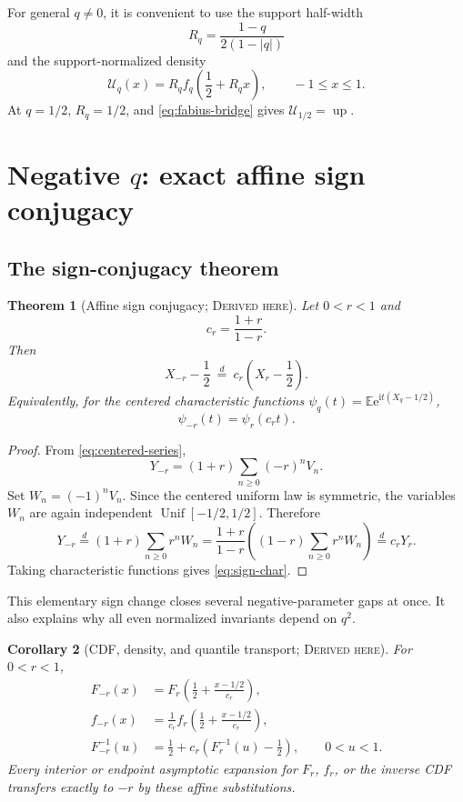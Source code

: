 \documentclass[11pt,oneside]{article}
\newtheorem{theorem}{Theorem}[section]
\newtheorem{corollary}[theorem]{Corollary}
\theoremstyle{definition}
\theoremstyle{remark}
\newcommand{\E}{\mathbb E}
\newcommand{\Unif}{\operatorname{Unif}}
\newcommand{\Up}{\operatorname{up}}
\newcommand{\ii}{\mathrm i}
\newcommand{\e}{\mathrm e}
\newcommand{\Derived}{\textsc{Derived here}}
\begin{document}
For general \(q\ne0\), it is convenient to use the support half-width
\begin{equation}\label{eq:Rq}
 R_q=\frac{1-q}{2(1-|q|)}
\end{equation}
and the support-normalized density
\begin{equation}\label{eq:Uq-def}
 \mathcal U_q(x)=R_q f_q\!\left(\frac12+R_qx\right),\qquad -1\le x\le1.
\end{equation}
At \(q=1/2\), \(R_q=1/2\), and \eqref{eq:fabius-bridge} gives
\(\mathcal U_{1/2}=\Up\).

\section{Negative \texorpdfstring{\(q\)}{q}: exact affine sign conjugacy}

\subsection{The sign-conjugacy theorem}
\begin{theorem}[Affine sign conjugacy; \Derived]\label{thm:sign-conjugacy}
Let \(0<r<1\) and
\[
 c_r=\frac{1+r}{1-r}.
\]
Then
\begin{equation}\label{eq:sign-law}
 X_{-r}-\frac12\ \stackrel d=\ c_r\left(X_r-\frac12\right).
\end{equation}
Equivalently, for the centered characteristic functions
\(\psi_q(t)=\E\e^{\ii t(X_q-1/2)}\),
\begin{equation}\label{eq:sign-char}
 \psi_{-r}(t)=\psi_r(c_rt).
\end{equation}
\end{theorem}

\begin{proof}
From \eqref{eq:centered-series},
\[
 Y_{-r}=(1+r)\sum_{n\ge0}(-r)^nV_n.
\]
Set \(W_n=(-1)^nV_n\).  Since the centered uniform law is symmetric, the
variables \(W_n\) are again independent \(\Unif[-1/2,1/2]\).  Therefore
\[
 Y_{-r}\stackrel d=(1+r)\sum_{n\ge0}r^nW_n
 =\frac{1+r}{1-r}\left((1-r)\sum_{n\ge0}r^nW_n\right)
 \stackrel d=c_rY_r.
\]
Taking characteristic functions gives \eqref{eq:sign-char}.
\end{proof}

This elementary sign change closes several negative-parameter gaps at once.
It also explains why all even normalized invariants depend on \(q^2\).

\begin{corollary}[CDF, density, and quantile transport; \Derived]
For \(0<r<1\),
\begin{align}
 F_{-r}(x)
 &=F_r\!\left(\frac12+\frac{x-1/2}{c_r}\right),\label{eq:cdf-transport}\\
 f_{-r}(x)
 &=\frac1{c_r}f_r\!\left(\frac12+\frac{x-1/2}{c_r}\right),\label{eq:density-transport}\\
 F_{-r}^{-1}(u)
 &=\frac12+c_r\left(F_r^{-1}(u)-\frac12\right),\qquad 0<u<1.
 \label{eq:quantile-transport}
\end{align}
Every interior or endpoint asymptotic expansion for \(F_r\), \(f_r\), or the
inverse CDF transfers exactly to \(-r\) by these affine substitutions.
\end{corollary}
\end{document}
